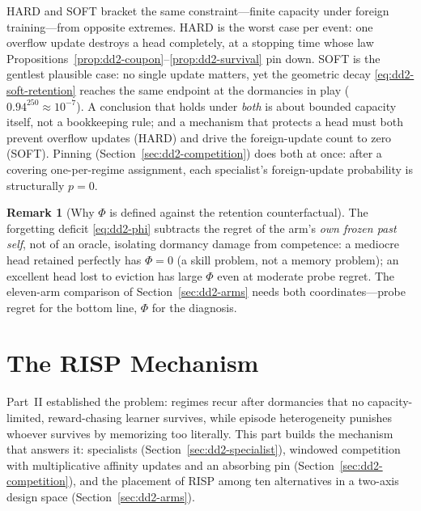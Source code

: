 \documentclass[11pt,a4paper]{article}
\theoremstyle{definition}
\newtheorem{remark}{Remark}[section]
\theoremstyle{plain}
\newcommand{\nm}{\textsc{RISP}}
\begin{document}
\begin{keypoint}[title={Two models, one phenomenon, bounded from both ends}]
HARD and SOFT bracket the same constraint---finite capacity under foreign
training---from opposite extremes. HARD is the worst case per event: one
overflow update destroys a head completely, at a stopping time whose law
Propositions~\ref{prop:dd2-coupon}--\ref{prop:dd2-survival} pin down. SOFT is
the gentlest plausible case: no single update matters, yet the geometric
decay \eqref{eq:dd2-soft-retention} reaches the same endpoint at the
dormancies in play ($0.94^{250} \approx 10^{-7}$). A conclusion that holds
under \emph{both} is about bounded capacity itself, not a bookkeeping rule;
and a mechanism that protects a head must both prevent overflow updates
(HARD) and drive the foreign-update count to zero (SOFT). Pinning
(Section~\ref{sec:dd2-competition}) does both at once: after a covering
one-per-regime assignment, each specialist's foreign-update probability is
structurally $p = 0$.
\end{keypoint}

\begin{remark}[Why $\Phi$ is defined against the retention counterfactual]
The forgetting deficit \eqref{eq:dd2-phi} subtracts the regret of the
arm's \emph{own frozen past self}, not of an oracle, isolating dormancy
damage from competence: a mediocre head retained perfectly has $\Phi = 0$
(a skill problem, not a memory problem); an excellent head lost to eviction
has large $\Phi$ even at moderate probe regret. The eleven-arm comparison of
Section~\ref{sec:dd2-arms} needs both coordinates---probe regret for the
bottom line, $\Phi$ for the diagnosis.
\end{remark}

\part{The \nm{} Mechanism}
\label{sec:dd2-part-mechanism}

Part~II established the problem: regimes recur after dormancies that no
capacity-limited, reward-chasing learner survives, while episode
heterogeneity punishes whoever survives by memorizing too literally. This
part builds the mechanism that answers it: specialists
(Section~\ref{sec:dd2-specialist}), windowed competition with multiplicative
affinity updates and an absorbing pin (Section~\ref{sec:dd2-competition}),
and the placement of \nm{} among ten alternatives in a two-axis design space
(Section~\ref{sec:dd2-arms}).
\end{document}
